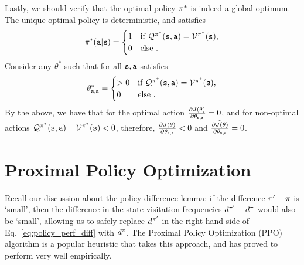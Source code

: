 Lastly, we should verify that the optimal policy $\pi^*$ is indeed a global optimum. The unique optimal policy is deterministic, and satisfies 
$$\pi^*({\tt a}|{\tt s}) = \begin{cases}
        1 & \text{if } \mathcal{Q}^{\pi^*}({\tt s},{\tt a}) = \mathcal{V}^{\pi^*}({\tt s}), \\
0 & \text{else }.
\end{cases}$$
Consider any $\theta^*$ such that for all ${\tt s},{\tt a}$ satisfies $$\theta^*_{{\tt s},{\tt a}} = \begin{cases}
        >0 & \text{if } \mathcal{Q}^{\pi^*}({\tt s},{\tt a}) = \mathcal{V}^{\pi^*}({\tt s}), \\
0 & \text{else }.
\end{cases}$$ 
By the above, we have that for the optimal action $\frac{\partial J(\theta)}{\partial \theta_{{\tt s},{\tt a}}} = 0$, and for non-optimal actions $\mathcal{Q}^{\pi^*}({\tt s},{\tt a}) - \mathcal{V}^{\pi^*}({\tt s}) < 0$, therefore, $\frac{\partial J(\theta)}{\partial \theta_{{\tt s},{\tt a}}} < 0$ and $\tilde{\frac{\partial J(\theta)}{\partial \theta_{{\tt s},{\tt a}}}} = 0$.

\section{Proximal Policy Optimization}

Recall our discussion about the policy difference lemma: if the difference $\pi' - \pi$ is `small', then the difference in the state visitation frequencies $d^{\pi'} - d^{\pi}$ would also be `small', allowing us to safely replace $d^{\pi'}$ in the right hand side of Eq.~\ref{eq:policy_perf_diff} with $d^{\pi}$. The Proximal Policy Optimization (PPO) algorithm is a popular heuristic that takes this approach, and has proved to perform very well empirically.


